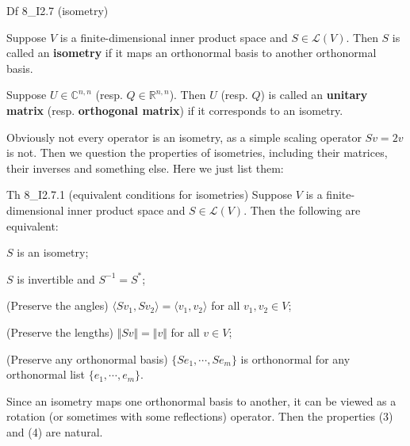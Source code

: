 \documentclass{article}
\begin{document}
\begin{Df}{Df 8\_I2.7 (isometry)}
    \begin{compactenum}
        \item Suppose $V$ is a finite-dimensional inner product space and $S\in\mathcal{L}(V)$. Then $S$ is called an \textbf{isometry} if it maps an orthonormal basis to another orthonormal basis. 
        \item Suppose $U\in\mathbb{C}^{n,n}$ (resp. $Q\in\mathbb{R}^{n,n}$). Then $U$ (resp. $Q$) is called an \textbf{unitary matrix} (resp. \textbf{orthogonal matrix}) if it corresponds to an isometry.
    \end{compactenum}
\end{Df}

\textcolor{Df}{Obviously not every operator is an isometry}, as a simple scaling operator $Sv = 2v$ is not. Then we question the properties of isometries, including their matrices, their inverses and something else. Here we just list them:

\begin{Th}{Th 8\_I2.7.1 (equivalent conditions for isometries)}
    Suppose $V$ is a finite-dimensional inner product space and $S\in\mathcal{L}(V)$. Then the following are equivalent:
    \begin{compactenum}
        \item $S$ is an isometry;
        \item $S$ is invertible and $S^{-1} = S^\ast$;
        \item (Preserve the angles) $\langle Sv_1, Sv_2\rangle = \langle v_1, v_2\rangle$ for all $v_1, v_2\in V$;
        \item (Preserve the lengths) $\Vert Sv\Vert = \Vert v\Vert$ for all $v\in V$;
        \item (Preserve any orthonormal basis) $\{Se_1,\cdots,Se_m\}$ is orthonormal for any orthonormal list $\{e_1,\cdots,e_m\}$.
    \end{compactenum}
\end{Th}

Since an isometry maps one orthonormal basis to another, it can be viewed as a rotation (or sometimes with some reflections) operator. Then the properties (3) and (4) are natural. 
\end{document}
